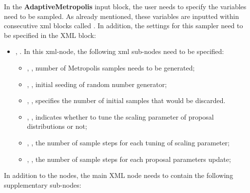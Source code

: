 In the \textbf{AdaptiveMetropolis} input block, the user needs to specify the variables need to be sampled.
As already mentioned, these variables are inputted within consecutive xml blocks called .
In addition, the settings for this sampler need to be specified in the  XML block:
\begin{itemize}
  \item {},  . In this xml-node, the following xml sub-nodes need to be specified:
  \begin{itemize}
    \item {},  , number of Metropolis samples needs to be generated;
    \item {}, , initial seeding of random number generator;
    \item {}, , specifies the number of initial samples that would be discarded.
    \item {}, , indicates whether to tune the scaling parameter of proposal distributions or not;
    \item {}, , the number of sample steps for each tuning of scaling parameter;
    \item {}, , the number of sample steps for each proposal parameters update;
  \end{itemize}
\end{itemize}

In addition to the  nodes, the main XML node
 needs to contain the following supplementary sub-nodes:

